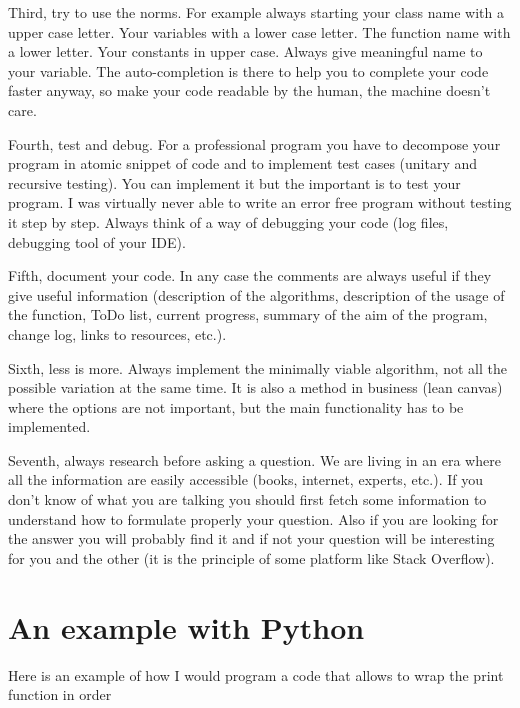 \documentclass[english, 12 pt, openany, oneside]{book}
\begin{document}
Third, try to use the norms. For example always starting your class name with a upper case letter. Your variables with a lower case letter. The function name with a lower letter. Your constants in upper case. Always give meaningful name to your variable. The auto-completion is there to help you to complete your code faster anyway, so make your code readable by the human, the machine doesn't care.

Fourth, test and debug. For a professional program you have to decompose your program in atomic snippet of code and to implement test cases (unitary and recursive testing). You can implement it but the important is to test your program. I was virtually never able to write an error free program without testing it step by step. Always think of a way of debugging your code (log files, debugging tool of your IDE).

Fifth, document your code. In any case the comments are always useful if they give useful information (description of the algorithms, description of the usage of the function, ToDo list, current progress, summary of the aim of the program, change log, links to resources, etc.).

Sixth, less is more. Always implement the minimally viable algorithm, not all the possible variation at the same time. It is also a method in business (lean canvas) where the options are not important, but the main functionality has to be implemented.

Seventh, always research before asking a question. We are living in an era where all the information are easily accessible (books, internet, experts, etc.). If you don't know of what you are talking you should first fetch some information to understand how to formulate properly your question. Also if you are looking for the answer you will probably find it and if not your question will be interesting for you and the other (it is the principle of some platform like Stack Overflow).

\section{An example with Python}
Here is an example of how I would program a code that allows to wrap the print function in order
\end{document}
